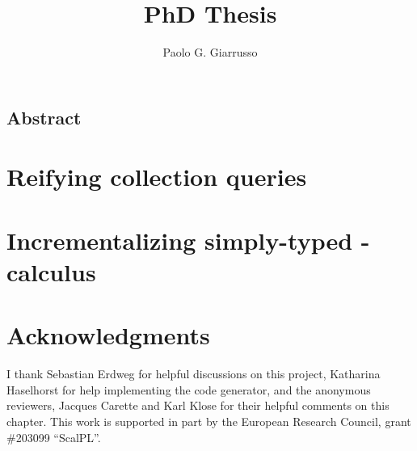 \documentclass{book}
\title{PhD Thesis}
\author{Paolo G. Giarrusso}
\begin{document}
\maketitle
\section*{Abstract}




\chapter{Reifying collection queries}
\label{sec:ch-aosd13}





\newcommand{\co}[1]{\code{#1}} %



\chapter{Incrementalizing simply-typed \TitleLambda{}-calculus}
















\begin{oldSec}

\end{oldSec}

\begin{oldSec}

\end{oldSec}




\chapter*{Acknowledgments}
I thank Sebastian Erdweg for helpful discussions on
this project, Katharina Haselhorst for help
implementing the code generator, and the anonymous reviewers, Jacques Carette and Karl Klose
for their helpful comments on this chapter.
This work is supported in part by the European Research Council, grant \#203099 ``ScalPL''.
\end{document}
